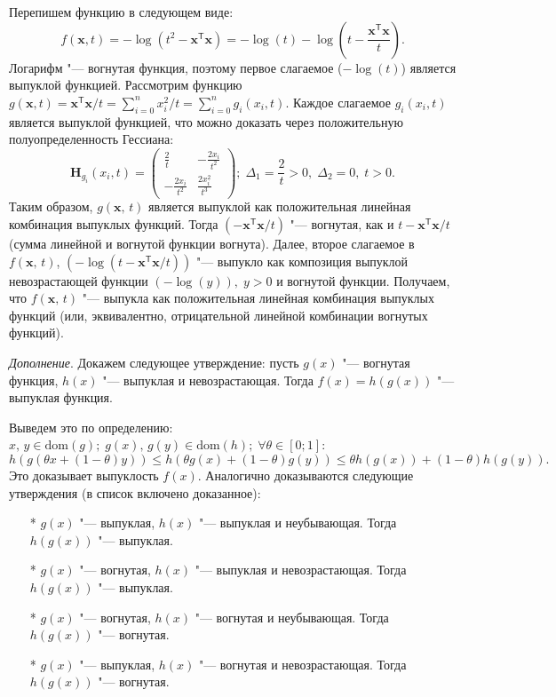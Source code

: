 \documentclass[a4paper,12pt]{article}
\begin{document}
\begin{enumerate}
\begin{enumerate}
			Перепишем функцию в следующем виде:
			\begin{equation*}
				f(\mathbf{x},t) = -\log(t^2 - \mathbf{x}^\mathsf{T}\mathbf{x}) = -\log(t) - \log\left(t -\frac{\mathbf{x}^\mathsf{T}\mathbf{x}}{t}\right).
			\end{equation*}
			Логарифм "--- вогнутая функция, поэтому первое слагаемое ($-\log(t)$) является выпуклой функцией. Рассмотрим функцию $g(\mathbf{x}, t) = \mathbf{x}^\mathsf{T}\mathbf{x} / t = \sum_{i=0}^n x_i^2/t =  \sum_{i=0}^n g_i(x_i, t)$. Каждое слагаемое $g_i(x_i, t)$ является выпуклой функцией, что можно доказать через положительную полуопределенность Гессиана: 
			\begin{equation*}
				\mathbf{H}_{g_i}(x_i,t) = 
				\begin{pmatrix}
					\frac{2}{t} & -\frac{2x_i}{t^2} \\
					-\frac{2x_i}{t^2} & \frac{2x_i^2}{t^3}
				\end{pmatrix};\; \Delta_1 = \frac{2}{t} > 0,\; \Delta_2 = 0,\; t > 0.
			\end{equation*}
			Таким образом, $g(\mathbf{x},\,t)$ является выпуклой как положительная линейная комбинация выпуклых функций. Тогда $(-\mathbf{x}^\mathsf{T}\mathbf{x}/t)$ "--- вогнутая, как и $t-\mathbf{x}^\mathsf{T}\mathbf{x}/t$ (сумма линейной и вогнутой функции вогнута). Далее, второе слагаемое в  $f(\mathbf{x},\,t)$, $(-\log\left(t -\mathbf{x}^\mathsf{T}\mathbf{x}/t\right))$ "--- выпукло как композиция выпуклой невозрастающей функции $(-\log(y)),\;y>0$ и вогнутой функции. Получаем, что $f(\mathbf{x},\,t)$ "--- выпукла как положительная линейная комбинация выпуклых функций (или, эквивалентно, отрицательной линейной комбинации вогнутых функций).
			
			\textit{Дополнение}. 
			Докажем следующее утверждение: пусть $g(x)$ "--- вогнутая функция, $h(x)$ "--- выпуклая и невозрастающая. Тогда $f(x) = h(g(x)) $ "--- выпуклая функция.
			
			Выведем это по определению: $x,\,y \in \text{dom}(g);\; g(x),\,g(y) \in \text{dom}(h);\; \forall \theta \in [0;1]$: 
			\begin{equation*}
					h(g(\theta x + (1-\theta)y)) \leqslant h(\theta g(x) + (1-\theta)g(y)) \leqslant 
					\theta h(g(x)) + (1-\theta) h(g(y)).
			\end{equation*}
			Это доказывает выпуклость $f(x)$. Аналогично доказываются следующие утверждения (в список включено доказанное):
			\begin{enumerate}
				\item[*] 
				$g(x)$ "--- выпуклая, $h(x)$ "--- выпуклая и неубывающая. Тогда $h(g(x)) $ "--- выпуклая.
				\item[*] 
				$g(x)$ "--- вогнутая, $h(x)$ "--- выпуклая и невозрастающая. Тогда $ h(g(x)) $ "--- выпуклая.
				\item[*] 
				$g(x)$ "--- вогнутая, $h(x)$ "--- вогнутая и неубывающая. Тогда $h(g(x)) $ "--- вогнутая.
				\item[*] 
				$g(x)$ "--- выпуклая, $h(x)$ "--- вогнутая и невозрастающая. Тогда $h(g(x)) $ "--- вогнутая.
			\end{enumerate}
			

\end{enumerate}
\end{enumerate}
\end{document}
